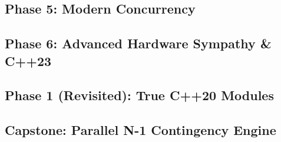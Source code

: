 \documentclass[11pt,a4paper]{article}
\begin{document}
\subsection{Phase 5: Modern Concurrency}


\subsection{Phase 6: Advanced Hardware Sympathy \& C++23}


\subsection{Phase 1 (Revisited): True C++20 Modules}



\subsection{Capstone: Parallel N-1 Contingency Engine}

\end{document}

